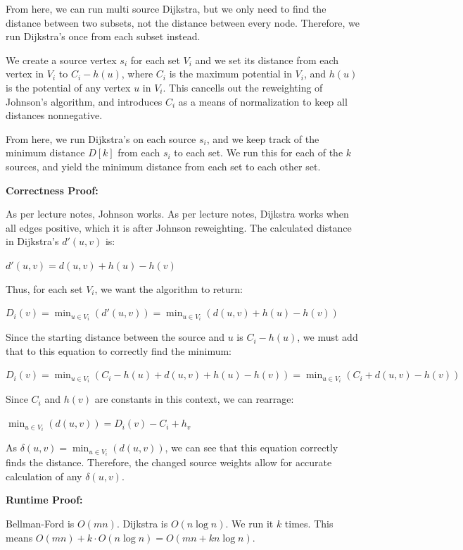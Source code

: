 \documentclass[11pt]{article}
\begin{document}
From here, we can run multi source Dijkstra, but we only need to find the distance between two subsets, not the distance between every node. 
Therefore, we run Dijkstra's once from each subset instead. 

We create a source vertex $s_i$ for each set $V_i$ and we set its distance from each vertex in $V_i$ to $C_i - h(u)$, 
where $C_i$ is the maximum potential in $V_i$, and $h(u)$ is the potential of any vertex $u$ in $V_i$. 
This cancells out the reweighting of Johnson's algorithm, and introduces $C_i$ as a means of normalization to keep 
all distances nonnegative. 

From here, we run Dijkstra's on each source $s_i$, and we keep track of the minimum distance $D[k]$ from each $s_i$ to each set. 
We run this for each of the $k$ sources, and yield the minimum distance from each set to each other set. 

\bigbreak

\textbf{Correctness Proof:}

As per lecture notes, Johnson works. 
As per lecture notes, Dijkstra works when all edges positive, which it is after Johnson reweighting. 
The calculated distance in Dijkstra's $d'(u, v)$ is:

$d'(u, v) = d(u, v) + h(u) - h(v)$

Thus, for each set $V_i$, we want the algorithm to return:

$D_i(v) = \min_{u \in V_i} (d'(u, v)) = \min_{u \in V_i} (d(u, v) + h(u) - h(v))$

Since the starting distance between the source and $u$ is $C_i - h(u)$, we must add that to this equation to correctly find the minimum:

$D_i(v) = \min_{u \in V_i} (C_i - h(u) + d(u, v) + h(u) - h(v)) = \min_{u \in V_i} (C_i + d(u, v) - h(v))$

Since $C_i$ and $h(v)$ are constants in this context, we can rearrage:

$\min_{u \in V_i} (d(u, v)) = D_i(v) - C_i + h_v$

As $\delta (u, v) = \min_{u \in V_i} (d(u, v))$, we can see that this equation correctly finds the distance. 
Therefore, the changed source weights allow for accurate calculation of any $\delta (u, v)$.

\bigbreak

\textbf{Runtime Proof:}

Bellman-Ford is $O(mn)$. Dijkstra is $O(n \log n)$. We run it $k$ times. This means $O(mn) + k \cdot O(n \log n) = O(mn + kn\log n)$.
\end{document}
